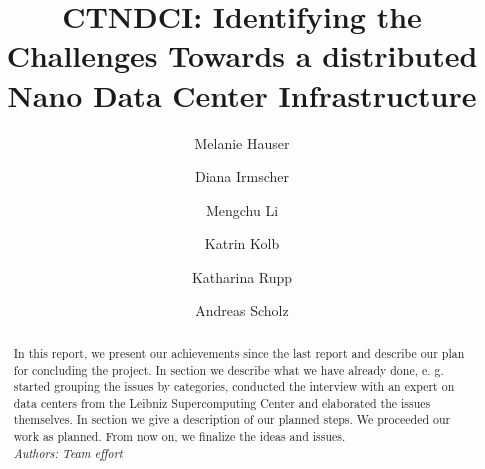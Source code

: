 \documentclass[sigchi-a, authorversion]{acmart}
\begin{document}
\title{CTNDCI: Identifying the Challenges Towards a distributed Nano Data Center Infrastructure }

\author{Melanie Hauser}

\author{Diana Irmscher} 

\author{Mengchu Li}

\author{Katrin Kolb}

\author{Katharina Rupp}

\author{Andreas Scholz}

\renewcommand{\shortauthors}{Katrin Kolb et al.}

\begin{abstract}
\label{abstract}
In this report, we present our achievements since the last report and describe our plan for concluding the project. In section  we describe what we have already done, e. g. started grouping the issues by categories, conducted the interview with an expert on data centers from the Leibniz Supercomputing Center and elaborated the issues themselves. In section  we give a description of our planned steps. We proceeded our work as planned. From now on, we finalize the ideas and issues. \\
\textit{Authors: Team effort}\\
\end{abstract}

\end{document}
